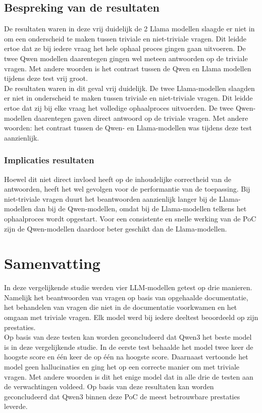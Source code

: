 \subsection{Bespreking van de resultaten}
De resultaten waren in deze vrij duidelijk de 2 Llama modellen slaagde er niet in om een onderscheid te maken tussen triviale en niet-triviale vragen. Dit leidde ertoe dat ze bij iedere vraag het hele ophaal proces gingen gaan uitvoeren. De twee Qwen modellen daarentegen gingen wel meteen antwoorden op de triviale vragen. Met andere woorden is het contrast tussen de Qwen en Llama modellen tijdens deze test vrij groot.
\\[1em]
De resultaten waren in dit geval vrij duidelijk. De twee Llama-modellen slaagden er niet in onderscheid te maken tussen triviale en niet-triviale vragen. Dit leidde ertoe dat zij bij elke vraag het volledige ophaalproces uitvoerden. De twee Qwen-modellen daarentegen gaven direct antwoord op de triviale vragen. Met andere woorden: het contrast tussen de Qwen- en Llama-modellen was tijdens deze test aanzienlijk.


\subsubsection{Implicaties resultaten}
Hoewel dit niet direct invloed heeft op de inhoudelijke correctheid van de antwoorden, heeft het wel gevolgen voor de performantie van de toepassing. Bij niet-triviale vragen duurt het beantwoorden aanzienlijk langer bij de Llama-modellen dan bij de Qwen-modellen, omdat bij de Llama-modellen telkens het ophaalproces wordt opgestart.
Voor een consistente en snelle werking van de PoC zijn de Qwen-modellen daardoor beter geschikt dan de Llama-modellen.


\section{Samenvatting}
In deze vergelijkende studie werden vier LLM-modellen getest op drie manieren. Namelijk het beantwoorden van vragen op basis van opgehaalde documentatie, het behandelen van vragen die niet in de documentatie voorkwamen en het omgaan met triviale vragen. Elk model werd bij iedere deeltest beoordeeld op zijn prestaties.
\\[1em]
Op basis van deze testen kan worden geconcludeerd dat Qwen3 het beste model is in deze vergelijkende studie. In de eerste test behaalde het model twee keer de hoogste score en één keer de op één na hoogste score. Daarnaast vertoonde het model geen hallucinaties en ging het op een correcte manier om met triviale vragen. Met andere woorden is dit het enige model dat in alle drie de testen aan de verwachtingen voldeed. Op basis van deze resultaten kan worden geconcludeerd dat Qwen3 binnen deze PoC de meest betrouwbare prestaties leverde.